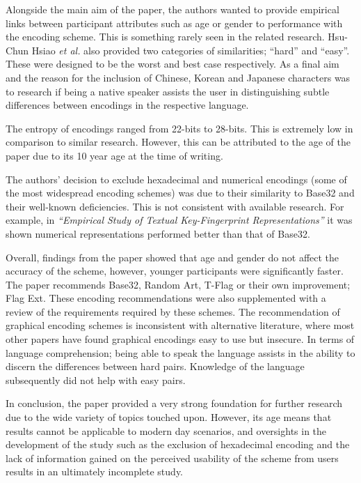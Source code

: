 Alongside the main aim of the paper, the authors wanted to provide empirical links between participant attributes such as age or gender to performance with the encoding scheme. This is something rarely seen in the related research. Hsu-Chun Hsiao \textit{et al.} also provided two categories of similarities; ``hard'' and ``easy''. These were designed to be the worst and best case respectively. As a final aim and the reason for the inclusion of Chinese, Korean and Japanese characters was to research if being a native speaker assists the user in distinguishing subtle differences between encodings in the respective language.

The entropy of encodings ranged from 22-bits to 28-bits. This is extremely low in comparison to similar research. However, this can be attributed to the age of the paper due to its 10 year age at the time of writing.

The authors' decision to exclude hexadecimal and numerical encodings (some of the most widespread encoding schemes) was due to their similarity to Base32 and their well-known deficiencies. This is not consistent with available research. For example, in \textit{``Empirical Study of Textual Key-Fingerprint Representations''} it was shown numerical representations performed better than that of Base32.

Overall, findings from the paper showed that age and gender do not affect the accuracy of the scheme, however, younger participants were significantly faster. \\
The paper recommends Base32, Random Art, T-Flag or their own improvement; Flag Ext. These encoding recommendations were also supplemented with a review of the requirements required by these schemes. The recommendation of graphical encoding schemes is inconsistent with alternative literature, where most other papers have found graphical encodings easy to use but insecure.
In terms of language comprehension; being able to speak the language assists in the ability to discern the differences between hard pairs. Knowledge of the language subsequently did not help with easy pairs.

In conclusion, the paper provided a very strong foundation for further research due to the wide variety of topics touched upon. However, its age means that results cannot be applicable to modern day scenarios, and oversights in the development of the study such as the exclusion of hexadecimal encoding and the lack of information gained on the perceived usability of the scheme from users results in an ultimately incomplete study.

